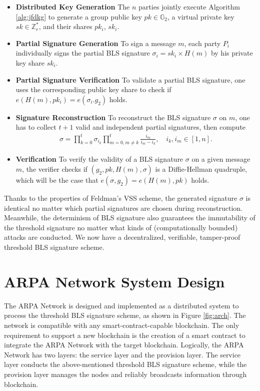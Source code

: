 \documentclass[11pt]{article}
\begin{document}
\begin{itemize}
    \item[] \textbf{Distributed Key Generation} The $n$ parties jointly execute Algorithm \ref{alg:jfdkg} to generate a group public key $pk \in \mathbb{G}_2$, a virtual private key $sk \in \mathbb{Z}_r^*$, and their shares $pk_i$, $sk_i$.
    \item[] \textbf{Partial Signature Generation} To sign a message $m$, each party $P_i$ individually signs the partial BLS signature $\sigma_i=sk_i \times H(m)$ by his private key share $sk_i$.
    \item[] \textbf{Partial Signature Verification} To validate a partial BLS signature, one uses the corresponding public key share to check if $e(H(m),pk_i)=e(\sigma_i.g_2)$ holds.
    \item[] \textbf{Signature Reconstruction} To reconstruct the BLS signature $\sigma$ on $m$, one has to collect $t+1$ valid and independent partial signatures, then compute
    \begin{align*}
        \sigma = \prod_{k=0}^t \sigma_{i_k} \prod_{m=0, m\neq k}^t \frac{i_m}{i_m-i_k},\quad i_k, i_m \in [1,n].
    \end{align*}
    \item[] \textbf{Verification} To verify the validity of a BLS signature $\sigma$ on a given message $m$, the verifier checks if $(g_2,pk,H(m),\sigma)$ is a Diffie-Hellman quadruple, which will be the case that $e(\sigma,g_2)=e(H(m),pk)$ holds.
\end{itemize}

Thanks to the properties of Feldman's VSS scheme, the generated signature $\sigma$ is identical no matter which partial signatures are chosen during reconstruction. Meanwhile, the determinism of BLS signature also guarantees the immutability of the threshold signature no matter what kinds of (computationally bounded) attacks are conducted. We now have a decentralized, verifiable, tamper-proof threshold BLS signature scheme.

\section{ARPA Network System Design}

The ARPA Network is designed and implemented as a distributed system to process the threshold BLS signature scheme, as shown in Figure \ref{fig:arch}. The network is compatible with any smart-contract-capable blockchain. The only requirement to support a new blockchain is the creation of a smart contract to integrate the ARPA Network with the target blockchain. Logically, the ARPA Network has two layers: the service layer and the provision layer. The service layer conducts the above-mentioned threshold BLS signature scheme, while the provision layer manages the nodes and reliably broadcasts information through blockchain. 
\end{document}
